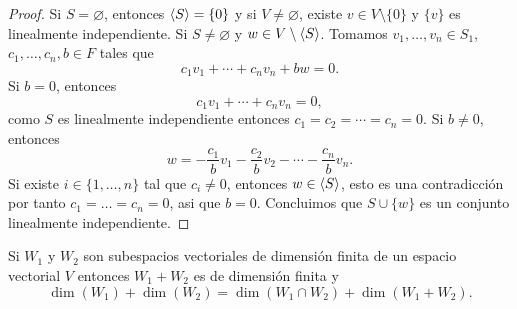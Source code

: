 \documentclass[12pt,a4paper]{book}
\begin{document}
    \begin{proof}
        Si $S=\varnothing$, entonces $\langle S \rangle=\{0\}$ y si $V\neq\varnothing$, existe $v\in V\setminus\{0\}$
        y $\{v\}$ es linealmente independiente. Si $S\neq\varnothing$ y $w\in V\setminus\langle S \rangle$.
        Tomamos $v_{1},\dots,v_{n}\in S_{1}$, $c_{1},\dots,c_{n},b\in F$ tales que
        \begin{equation*}
            c_{1}v_{1}+\cdots+c_{n}v_{n}+bw=0.
        \end{equation*}
        Si $b=0$, entonces
        \begin{equation*}
            c_{1}v_{1}+\cdots+c_{n}v_{n}=0,
        \end{equation*}
        como $S$ es linealmente independiente entonces $c_{1}=c_{2}=\cdots=c_{n}=0$. Si $b\neq0$,
        entonces
        \begin{equation*}
            w=-\frac{c_{1}}{b}v_{1}-\frac{c_{2}}{b}v_{2}-\cdots-\frac{c_{n}}{b}v_{n}.
        \end{equation*}
        Si existe $i\in\{1,\dots,n\}$ tal que $c_{i}\neq0$, entonces $w\in\langle S \rangle$, esto es
        una contradicción por tanto $c_{1}=\dots=c_{n}=0$, asi que $b=0$. Concluimos que
        $S\cup\{w\}$ es un conjunto linealmente independiente.
    \end{proof}

    \begin{lema}
        Si $W_{1}$ y $W_{2}$ son subespacios vectoriales de dimensión finita de un espacio
        vectorial $V$ entonces $W_{1}+W_{2}$ es de dimensión finita y
        \begin{equation*}
            \dim(W_{1})+\dim(W_{2})=\dim(W_{1}\cap W_{2})+\dim(W_{1}+W_{2}).
        \end{equation*}
    \end{lema}
\end{document}

